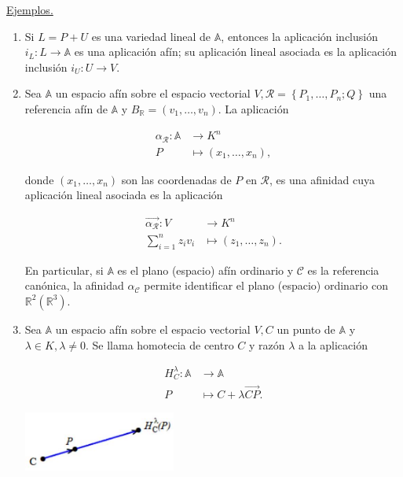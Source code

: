 \documentclass[12pt, a4paper, ones, notitlepage, openany,titlepage]{article}
\begin{document}
\underline{Ejemplos.}
\begin{enumerate}
\item Si $L=P+U$ es una variedad lineal de $\mathbb{A}$, entonces la aplicación inclusión $i_{L}: L \rightarrow \mathbb{A}$ es una aplicación afín; su aplicación lineal asociada es la aplicación inclusión $i_{U}: U \rightarrow V$.

\item Sea $\mathbb{A}$ un espacio afín sobre el espacio vectorial $V, \mathcal{R}=\left\{P_{1}, \ldots, P_{n} ; Q\right\}$ una referencia afín de $\mathbb{A}$ y $B_{\mathbb{R}}=\left(v_{1}, \ldots, v_{n}\right)$. La aplicación

$$
\begin{aligned}
\alpha_{\mathcal{R}}: \mathbb{A} & \longrightarrow K^{n} \\
P & \longmapsto\left(x_{1}, \ldots, x_{n}\right),
\end{aligned}
$$

donde $\left(x_{1}, \ldots, x_{n}\right)$ son las coordenadas de $P$ en $\mathcal{R}$, es una afinidad cuya aplicación lineal asociada es la aplicación

$$
\begin{aligned}
\overrightarrow{\alpha_{\mathcal{R}}}: V & \longrightarrow K^{n} \\
\sum_{i=1}^{n} z_{i} v_{i} & \longmapsto\left(z_{1}, \ldots, z_{n}\right) .
\end{aligned}
$$

En particular, si $\mathbb{A}$ es el plano (espacio) afín ordinario y $\mathcal{C}$ es la referencia canónica, la afinidad $\alpha_{\mathcal{C}}$ permite identificar el plano (espacio) ordinario con $\mathbb{R}^{2}\left(\mathbb{R}^{3}\right)$.

\item Sea $\mathbb{A}$ un espacio afín sobre el espacio vectorial $V, C$ un punto de $\mathbb{A}$ y $\lambda \in K, \lambda \neq 0$. Se llama homotecia de centro $C$ y razón $\lambda$ a la aplicación

$$
\begin{aligned}
H_{C}^{\lambda}: \mathbb{A} & \longrightarrow \mathbb{A} \\
P & \longmapsto C+\lambda \overrightarrow{C P} .
\end{aligned}
$$

\begin{center}
\includegraphics[max width=5cm]{2023_03_01_7659aec5e35f9a9b2d3cg-25}
\end{center}


\end{enumerate}
\end{document}
